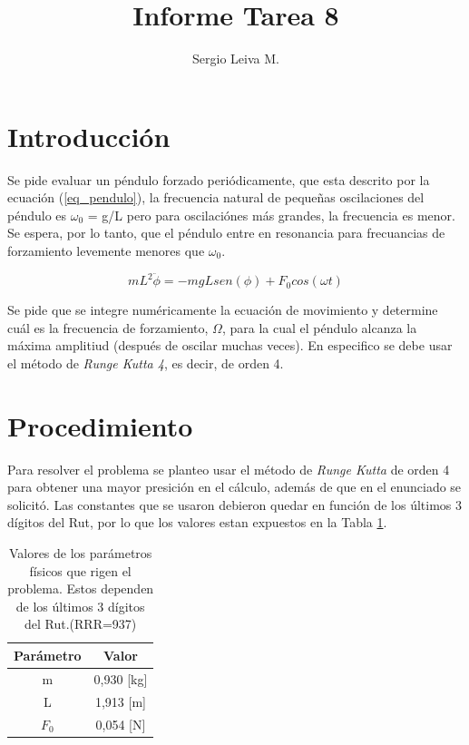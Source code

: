 \documentclass[10pt]{article}
\begin{document}
\author{Sergio Leiva M.}
\title{\textbf{Informe Tarea 8}}
\date{}
\maketitle

\thispagestyle{firstpage}


\section{Introducción}
Se pide evaluar un péndulo forzado periódicamente, que esta descrito por la ecuación (\ref{eq_pendulo}), la frecuencia natural de pequeñas oscilaciones del péndulo es $\omega_0$ = g/L pero para oscilaciónes
más grandes, la frecuencia es menor. Se espera, por lo tanto, que el péndulo entre en resonancia para frecuancias de forzamiento levemente menores que $\omega_0$.

\begin{equation}
mL^2\ddot{\phi}=-mgLsen(\phi)+F_0cos(\omega t)
\label{eq_pendulo}
\end{equation}
 
 Se pide que se integre numéricamente la ecuación de movimiento y determine cuál es la frecuencia de forzamiento, $\Omega$, para la cual el péndulo alcanza la máxima amplitiud (después de oscilar muchas veces). En especifico se debe usar el método de \textit{Runge Kutta 4}, es decir, de orden 4.
 
\section{Procedimiento}
 Para resolver el problema se planteo usar el método de \textit{Runge Kutta} de orden 4 para obtener una mayor presición en el cálculo, además de que en el enunciado se solicitó. Las constantes que se usaron debieron quedar en función de los últimos 3 dígitos del Rut, por lo que los valores estan expuestos en la Tabla \ref{tab_valores}. 
 
\begin{table}[H]
\centering
\begin{tabular}{|c|c|}
\hline
Parámetro & Valor \\
\hline
m & 0,930 [kg] \\
\hline
L & 1,913 [m]\\
\hline
$F_0$ & 0,054 [N] \\
\hline
\end{tabular}
\caption{Valores de los parámetros físicos que rigen el problema. Estos dependen de los últimos 3 dígitos del Rut.(RRR=937) }
\label{tab_valores}
\end{table}
\end{document}
